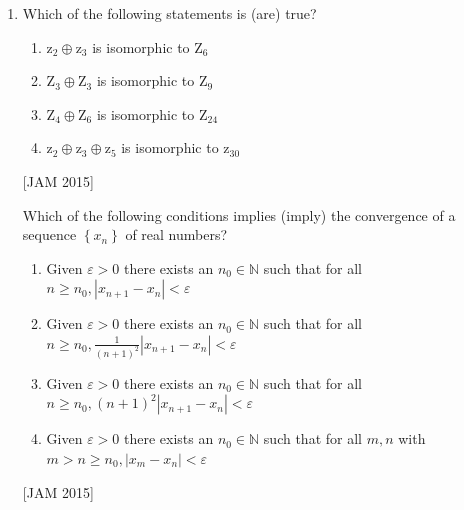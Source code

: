 \begin{enumerate}
\begin{enumerate}
\item $[-6,0]$\\
\item $[-2,4]$\\
\item $[2,8]$\\
\item $[6,12]$
\end{enumerate}
\hfill [JAM 2015]




\item  Which of the following statements is (are) true?\\

\begin{enumerate}
    \item $\mathrm{z}_{2} \oplus \mathrm{z}_{3}$ is isomorphic to $\mathrm{Z}_{6}$\\
\item $\mathrm{Z}_{3} \oplus \mathrm{Z}_{3}$ is isomorphic to $\mathrm{Z}_{9}$\\
\item $\mathrm{Z}_{4} \oplus \mathrm{Z}_{6}$ is isomorphic to $\mathrm{Z}_{24}$\\
\item $\mathrm{z}_{2} \oplus \mathrm{z}_{3} \oplus \mathrm{z}_{5}$ is isomorphic to $\mathrm{z}_{30}$
\end{enumerate}
\hfill [JAM 2015]



 Which of the following conditions implies (imply) the convergence of a sequence $\left\{x_{n}\right\}$ of real numbers?
\begin{enumerate}
    \item Given $\varepsilon>0$ there exists an $n_{0} \in \mathbb{N}$ such that for all $n \geq n_{0},\left|x_{n+1}-x_{n}\right|<\varepsilon$
\item Given $\varepsilon>0$ there exists an $n_{0} \in \mathbb{N}$ such that for all $n \geq n_{0}, \frac{1}{(n+1)^{2}}\left|x_{n+1}-x_{n}\right|<\varepsilon$
\item Given $\varepsilon>0$ there exists an $n_{0} \in \mathbb{N}$ such that for all $n \geq n_{0},(n+1)^{2}\left|x_{n+1}-x_{n}\right|<\varepsilon$
\item Given $\varepsilon>0$ there exists an $n_{0} \in \mathbb{N}$ such that for all $m, n$ with $m>n \geq n_{0},\left|x_{m}-x_{n}\right|<\varepsilon$
\end{enumerate}
\hfill [JAM 2015]






\end{enumerate}
